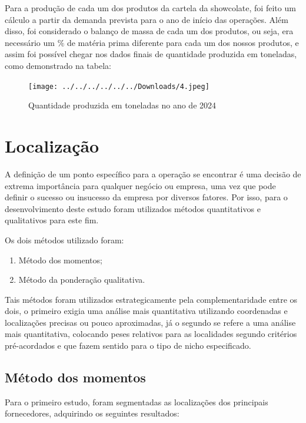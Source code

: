 \documentclass[
	12pt,				%
	openright,			%
	oneside,			%
	a4paper,			%
	english,			%
	french,				%
	spanish,			%
	brazil				%
	]{abntex2}
\begin{document}
Para a produção de cada um dos produtos da cartela da showcolate, foi feito um cálculo a partir da demanda prevista para o ano de início das operações. Além disso, foi considerado o balanço de massa de cada um dos produtos, ou seja, era necessário um $\%$ de matéria prima diferente para cada um dos nossos produtos, e assim foi possível chegar nos dados finais de quantidade produzida em toneladas, como demonstrado na tabela:

\begin{figure}[H]
\begin{center}
\caption{Quantidade produzida em toneladas no ano de 2024}
\texttt{[image: ../../../../../../Downloads/4.jpeg]} 
\end{center}
\end{figure}


\newpage
\chapter{Localização}

A definição de um ponto específico para a operação se encontrar é uma decisão de extrema importância para qualquer negócio ou empresa, uma vez que pode definir o sucesso ou insucesso da empresa por diversos fatores. Por isso, para o desenvolvimento deste estudo foram utilizados métodos quantitativos e qualitativos para este fim.

Os dois métodos utilizado foram:

\begin{enumerate}
\item Método dos momentos;
\item Método da ponderação qualitativa.
\end{enumerate}

Tais métodos foram utilizados estrategicamente pela complementaridade entre os dois, o primeiro exigia uma análise mais quantitativa utilizando coordenadas e localizações precisas ou pouco aproximadas, já o  segundo se refere a uma análise mais quantitativa, colocando peses relativos para as localidades segundo critérios pré-acordados e que fazem sentido para o tipo de nicho especificado.

\section{Método dos momentos}

Para o primeiro estudo, foram segmentadas as localizações dos principais fornecedores, adquirindo os seguintes resultados:
\end{document}
